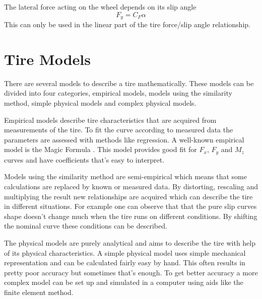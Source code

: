 The lateral force acting on the wheel depends on its slip angle
\begin{equation}
F_{y}=C_{F}\alpha
\end{equation}
This can only be used in the linear part of the tire force/slip angle relationship. 



\section{Tire Models}

There are several models to describe a tire mathematically. These models can be divided into four categories, empirical models, models using the similarity method, simple physical models and complex physical  models. 

Empirical models describe tire characteristics that are acquired from measurements of the tire. To fit the curve according to measured data the parameters are assessed with methods like regression. A well-known empirical model is the Magic Formula \cite{pacejka}. This model provides good fit for $F_{x}$, $F_{y}$ and $M_{z}$ curves and have coefficients that's easy to interpret.

Models using the similarity method are semi-empirical which means that some calculations are replaced by known or measured data. By distorting, rescaling and multiplying the result new relationships are acquired which can describe the tire in different situations. For example one can observe that that the pure slip curves shape doesn't change much \cite{pacejka} when the tire runs on different conditions. By shifting the nominal curve these conditions can be described.

The physical models are purely analytical and aims to describe the tire with help of its physical characteristics. A simple physical model uses simple mechanical representation and can be calculated fairly easy by hand. This often results in pretty poor accuracy but sometimes that's enough. To get better accuracy a more complex model can be set up and simulated in a computer using aids like the finite element method. 

